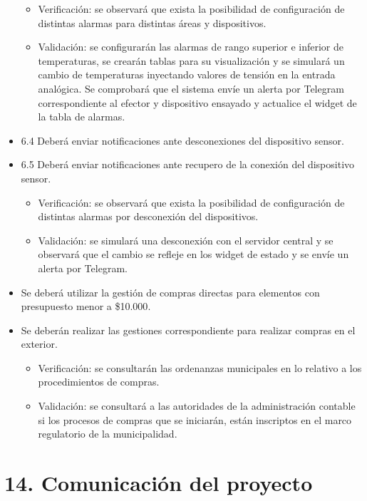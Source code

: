 \documentclass[11pt]{charter}
\begin{document}
\begin{itemize}
\begin{itemize}
\item Verificación: se observará que exista la posibilidad de configuración de distintas alarmas para distintas áreas y dispositivos.
\item Validación: se configurarán las alarmas de rango superior e inferior de temperaturas, se crearán tablas para su visualización y se simulará un cambio de temperaturas inyectando valores de tensión en la entrada analógica. Se comprobará que el sistema envíe un alerta por Telegram correspondiente al efector y dispositivo ensayado y actualice el widget de la tabla de alarmas. 
\end{itemize}

\item 6.4 Deberá enviar notificaciones ante desconexiones del dispositivo sensor.
\item 6.5 Deberá enviar notificaciones ante recupero de la conexión del dispositivo sensor. 
\begin{itemize}
\item Verificación: se observará que exista la posibilidad de configuración de distintas alarmas por desconexión del dispositivos.
\item Validación: se simulará una desconexión con el servidor central y se observará que el cambio se refleje en los widget de estado y se envíe un alerta por Telegram.
\end{itemize}
 
\item Se deberá utilizar la gestión de compras directas para elementos con presupuesto menor a {\$10.000}.
\item Se deberán realizar las gestiones correspondiente para realizar compras en el exterior.

\begin{itemize}
\item Verificación: se consultarán las ordenanzas municipales en lo relativo a los procedimientos de compras.
\item Validación: se consultará a las autoridades de la administración contable si los procesos de compras que se iniciarán, están inscriptos en el marco regulatorio de la municipalidad.
\end{itemize}


\end{itemize}

\section{14. Comunicación del proyecto}
\label{sec:comunicaciones}
\end{document}
